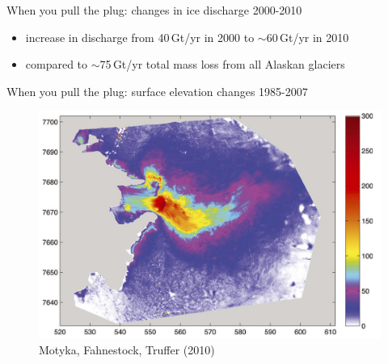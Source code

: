 \documentclass[hide notes,intlimits]{beamer}
\begin{document}
\begin{frame}{When you pull the plug: changes in ice discharge 2000-2010}
  \begin{itemize}
  \item increase in discharge from 40\,Gt/yr in 2000 to $\sim$60\,Gt/yr in 2010
  \item compared to $\sim$75\,Gt/yr total mass loss from all Alaskan glaciers
  \end{itemize}
\end{frame}


{
%
} 

\begin{frame}{When you pull the plug: surface elevation changes 1985-2007}

  \begin{figure}
    \includegraphics[width=.8\textwidth]{jib-obs-surface-diff-motyka} \\
    \footnotesize{Motyka, Fahnestock, Truffer (2010)}
  \end{figure}
\end{frame}
\end{document}
